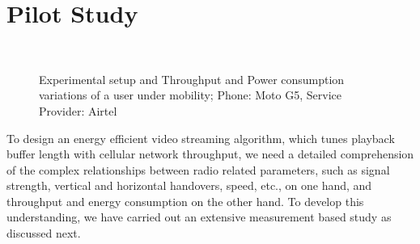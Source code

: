 
\graphicspath{{Chapters/03.DASH/img/}}

\section{\textbf{Pilot Study}}\label{sec:chap03:EnDASHPilot}
\begin{figure}[ht]
	\captionsetup[subfigure]{width=0.49\linewidth}
	\begin{center}
		\\
	\end{center}
	\caption{Experimental setup and Throughput and Power consumption variations of a user under mobility; Phone: Moto G5, Service Provider: Airtel}
\end{figure}
To design an energy efficient video streaming algorithm, which tunes playback buffer length with cellular network throughput, we need a detailed comprehension of the complex relationships between radio related parameters, such as signal strength, vertical and horizontal handovers, speed, etc., on one hand, and throughput and energy consumption on the other hand. To develop this understanding, we have carried out an extensive measurement based study as discussed next.
